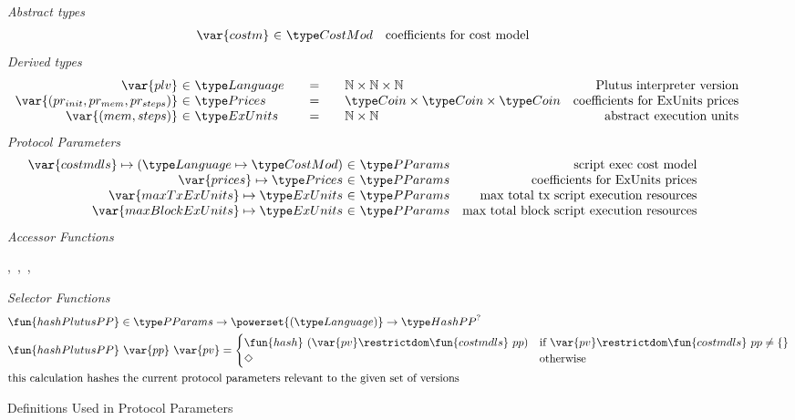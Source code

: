 \begin{figure*}[htb]
  \emph{Abstract types}
  \begin{equation*}
    \begin{array}{r@{~\in~}lr}
      \var{costm} & \CostMod & \text{coefficients for cost model} \\
    \end{array}
  \end{equation*}
  \emph{Derived types}
  \begin{equation*}
    \begin{array}{r@{~\in~}l@{\qquad=\qquad}lr}
      \var{plv} & \Language
      & \N \times \N \times \N
      & \text{Plutus interpreter version}
      \\
      \var{(pr_{init}, pr_{mem}, pr_{steps})}
      & \Prices
      & \Coin \times \Coin \times \Coin
      & \text {coefficients for ExUnits prices}
      \\
      \var{(mem, steps)}
      & \ExUnits
      & \N \times \N
      & \text{abstract execution units} \\
    \end{array}
  \end{equation*}
  \emph{Protocol Parameters}
  \begin{equation*}
      \begin{array}{r@{~\in~}lr}
        \var{costmdls} \mapsto (\Language \mapsto \CostMod) & \PParams & \text{script exec cost model}\\
        \var{prices} \mapsto \Prices & \PParams & \text{coefficients for ExUnits prices} \\
        \var{maxTxExUnits} \mapsto \ExUnits & \PParams & \text{max total tx script execution resources}\\
        \var{maxBlockExUnits} \mapsto \ExUnits & \PParams & \text{max total block script execution resources}\\
      \end{array}
  \end{equation*}
  \emph{Accessor Functions}
  \begin{center}
  ,~,~,~
  \end{center}
  \emph{Selector Functions}
  \begin{align*}
    & \fun{hashPlutusPP} \in \PParams \to \powerset{(\Language)} \to \HashPP^?   \\
    & \fun{hashPlutusPP}~\var{pp}~\var{pv} = \begin{cases}
         \fun{hash}~(\var{pv} \restrictdom \fun{costmdls}~{pp}) 
                           & \text{if~} \var{pv} \restrictdom \fun{costmdls}~{pp} \neq \{\} \\
              \Nothing & \text{otherwise} \\
      \end{cases} \\
    & \text{this calculation hashes the current protocol parameters relevant to
    the given set of versions}
  \end{align*}
  \caption{Definitions Used in Protocol Parameters}
  \label{fig:defs:protocol-parameters}
\end{figure*}


\clearpage
